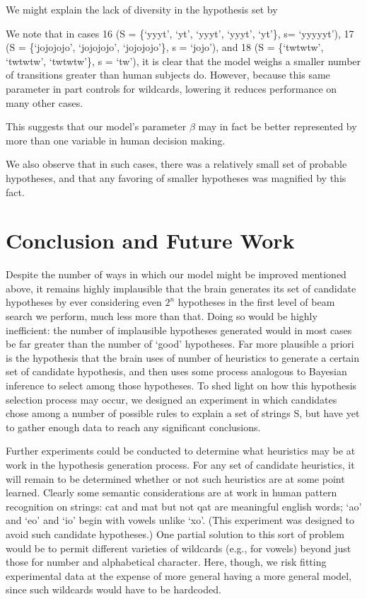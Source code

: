 \documentclass[10pt,letterpaper]{article}
\begin{document}
We might explain the lack of diversity in the hypothesis set by 

We note that in cases 16 (S = \{`yyyt', `yt', `yyyt', `yyyt', `yt'\}, s= `yyyyyt'), 17 (S = \{`jojojojo', `jojojojo', `jojojojo'\}, s = `jojo'), and 18 (S = \{`twtwtw', `twtwtw', `twtwtw'\}, s =  `tw'), it is clear that the model weighs a smaller number of transitions greater than human subjects do. However, because this same parameter in part controls for wildcards, lowering it reduces performance on many other cases. 

This suggests that our model's parameter $\beta$ may in fact be better represented by more than one variable in human decision making. 

We also observe that in such cases, there was a relatively small set of probable hypotheses, and that any favoring of smaller hypotheses was magnified by this fact. 
\section{Conclusion and Future Work}
Despite the number of ways in which our model might be improved mentioned above,  it remains highly implausible that the brain generates its set of candidate hypotheses by ever considering even $2^n$ hypotheses in the first level of beam search we perform, much less more than that. Doing so would be highly inefficient: the number of implausible hypotheses generated would in most cases be far greater than the number of `good' hypotheses. Far more plausible a priori is the hypothesis that the brain uses of number of heuristics to generate a certain set of candidate hypothesis, and then uses some process analogous to Bayesian inference to select among those hypotheses. To shed light on how this hypothesis selection process may occur, we designed an experiment in which candidates chose among a number of possible rules to explain a set of strings S, but have yet to gather enough data to reach any significant conclusions. 

Further experiments could be conducted to determine what heuristics may be at work in the hypothesis generation process. For any set of candidate heuristics, it will remain to be determined whether or not such heuristics are at some point learned. Clearly some semantic considerations are at work in human pattern recognition on strings: cat and mat but not qat are meaningful english words; `ao' and `eo' and `io' begin with vowels unlike `xo'. (This experiment was designed to avoid such candidate hypotheses.) One partial solution to this sort of problem would be to permit different varieties of wildcards (e.g., for vowels) beyond just those for number and alphabetical character. Here, though, we risk fitting experimental data at the expense of more general having a more general model, since such wildcards would have to be hardcoded. 
\end{document}
